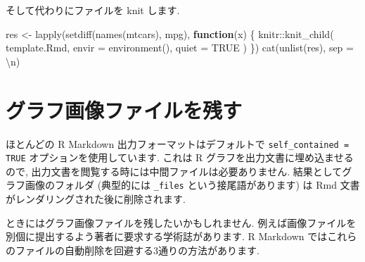 \documentclass[
  11pt,
]{bxjsreport}
\newenvironment{Shaded}{\begin{snugshade}}{\end{snugshade}}
\newcommand{\AttributeTok}[1]{\textcolor[rgb]{0.77,0.63,0.00}{#1}}
\newcommand{\ConstantTok}[1]{\textcolor[rgb]{0.00,0.00,0.00}{#1}}
\newcommand{\ControlFlowTok}[1]{\textcolor[rgb]{0.13,0.29,0.53}{\textbf{#1}}}
\newcommand{\FunctionTok}[1]{\textcolor[rgb]{0.00,0.00,0.00}{#1}}
\newcommand{\NormalTok}[1]{#1}
\newcommand{\OtherTok}[1]{\textcolor[rgb]{0.56,0.35,0.01}{#1}}
\newcommand{\SpecialCharTok}[1]{\textcolor[rgb]{0.00,0.00,0.00}{#1}}
\newcommand{\StringTok}[1]{\textcolor[rgb]{0.31,0.60,0.02}{#1}}
\begin{document}
そして代わりにファイルを knit します.

\begin{Shaded}
\begin{Highlighting}[numbers=left,,]
\NormalTok{res }\OtherTok{\textless{}{-}} \FunctionTok{lapply}\NormalTok{(}\FunctionTok{setdiff}\NormalTok{(}\FunctionTok{names}\NormalTok{(mtcars), }\StringTok{\textquotesingle{}mpg\textquotesingle{}}\NormalTok{), }\ControlFlowTok{function}\NormalTok{(x) \{}
\NormalTok{  knitr}\SpecialCharTok{::}\FunctionTok{knit\_child}\NormalTok{(}
    \StringTok{\textquotesingle{}template.Rmd\textquotesingle{}}\NormalTok{, }\AttributeTok{envir =} \FunctionTok{environment}\NormalTok{(), }\AttributeTok{quiet =} \ConstantTok{TRUE}
\NormalTok{  )}
\NormalTok{\})}
\FunctionTok{cat}\NormalTok{(}\FunctionTok{unlist}\NormalTok{(res), }\AttributeTok{sep =} \StringTok{\textquotesingle{}}\SpecialCharTok{\textbackslash{}n}\StringTok{\textquotesingle{}}\NormalTok{)}
\end{Highlighting}
\end{Shaded}

\hypertarget{keep-files}{%
\section{グラフ画像ファイルを残す}\label{keep-files}}

ほとんどの R Markdown 出力フォーマットはデフォルトで \texttt{self\_contained = TRUE} オプションを使用しています. これは R グラフを出力文書に埋め込ませるので, 出力文書を閲覧する時には中間ファイルは必要ありません. 結果としてグラフ画像のフォルダ (典型的には \texttt{\_files} という接尾語があります) は Rmd 文書がレンダリングされた後に削除されます.

ときにはグラフ画像ファイルを残したいかもしれません. 例えば画像ファイルを別個に提出するよう著者に要求する学術誌があります. R Markdown ではこれらのファイルの自動削除を回避する3通りの方法があります.
\end{document}
